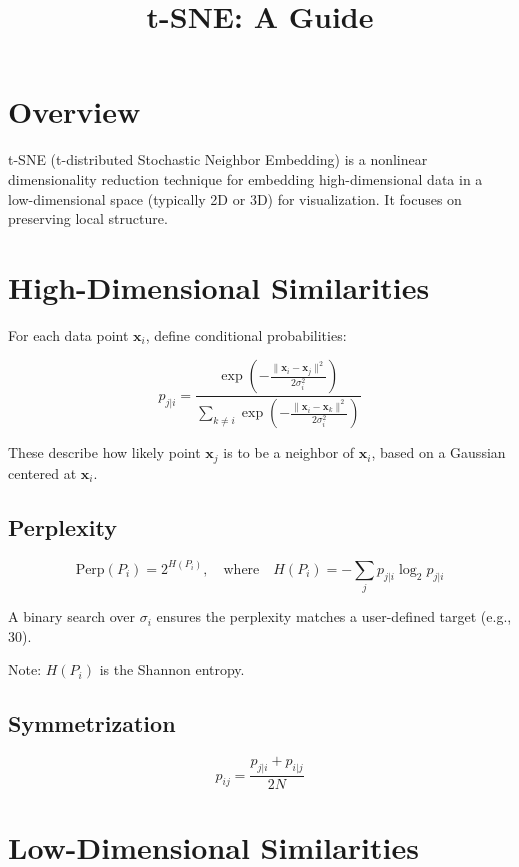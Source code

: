 \documentclass[11pt]{article}
\title{t-SNE: A Guide}
\date{}
\begin{document}
\maketitle

\section{Overview}

t-SNE (t-distributed Stochastic Neighbor Embedding) is a nonlinear dimensionality reduction technique for embedding
high-dimensional data in a low-dimensional space (typically 2D or 3D) for visualization. It focuses on preserving local
structure.

\section{High-Dimensional Similarities}

For each data point \( \mathbf{x}_i \), define conditional probabilities:

\[
  p_{j|i} = \frac{\exp\left(-\frac{\|\mathbf{x}_i - \mathbf{x}_j\|^2}{2\sigma_i^2}\right)}{\sum_{k \ne i} \exp\left(-\frac{\|\mathbf{x}_i - \mathbf{x}_k\|^2}{2\sigma_i^2}\right)}
\]

These describe how likely point \( \mathbf{x}_j \) is to be a neighbor of \( \mathbf{x}_i \), based on a Gaussian
centered at \( \mathbf{x}_i \).

\subsection*{Perplexity}

\[
  \text{Perp}(P_i) = 2^{H(P_i)}, \quad \text{where} \quad H(P_i) = -\sum_j p_{j|i} \log_2 p_{j|i}
\]

A binary search over \( \sigma_i \) ensures the perplexity matches a user-defined target (e.g., 30).

Note: \( H(P_i) \) is the Shannon entropy.

\subsection*{Symmetrization}

\[
  p_{ij} = \frac{p_{j|i} + p_{i|j}}{2N}
\]

\section{Low-Dimensional Similarities}
\end{document}
